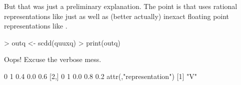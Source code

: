 \documentclass{article}
\begin{document}
But that was just a preliminary explanation.  The point is that \verb@scdd@
uses rational representations like \verb@quuxq@ just as well as (better
actually) inexact floating point representations like \verb@quux@.
\begin{Schunk}
\begin{Sinput}
> outq <- scdd(quuxq)
> print(outq)
\end{Sinput}
\end{Schunk}
Oops!  Excuse the verbose mess.
\begin{Schunk}
\begin{Soutput}
     [,1] [,2] [,3] [,4] [,5]
[1,]    0    1  0.4  0.0  0.6
[2,]    0    1  0.0  0.8  0.2
attr(,"representation")
[1] "V"
\end{Soutput}
\end{Schunk}
\end{document}
